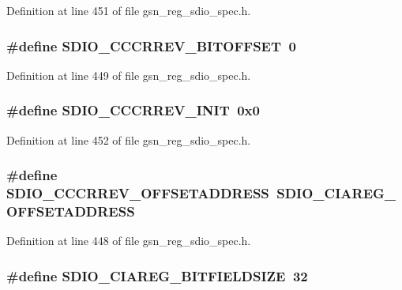 Definition at line 451 of file gsn\_\-reg\_\-sdio\_\-spec.h.

\hypertarget{a00571_a5e86721e7c9940d5ce5fa231cb751a61}{
\subsubsection[{SDIO\_\-CCCRREV\_\-BITOFFSET}]{\setlength{\rightskip}{0pt plus 5cm}\#define SDIO\_\-CCCRREV\_\-BITOFFSET~0}}
\label{a00571_a5e86721e7c9940d5ce5fa231cb751a61}


Definition at line 449 of file gsn\_\-reg\_\-sdio\_\-spec.h.

\hypertarget{a00571_ad170373a0f32920ed8df9cec00c9746d}{
\subsubsection[{SDIO\_\-CCCRREV\_\-INIT}]{\setlength{\rightskip}{0pt plus 5cm}\#define SDIO\_\-CCCRREV\_\-INIT~0x0}}
\label{a00571_ad170373a0f32920ed8df9cec00c9746d}


Definition at line 452 of file gsn\_\-reg\_\-sdio\_\-spec.h.

\hypertarget{a00571_a3bf2b1a6e4c4d0f671814dbafdc310d0}{
\subsubsection[{SDIO\_\-CCCRREV\_\-OFFSETADDRESS}]{\setlength{\rightskip}{0pt plus 5cm}\#define SDIO\_\-CCCRREV\_\-OFFSETADDRESS~SDIO\_\-CIAREG\_\-OFFSETADDRESS}}
\label{a00571_a3bf2b1a6e4c4d0f671814dbafdc310d0}


Definition at line 448 of file gsn\_\-reg\_\-sdio\_\-spec.h.

\hypertarget{a00571_a8bb86d03a43dedd115e9b60405c5b286}{
\subsubsection[{SDIO\_\-CIAREG\_\-BITFIELDSIZE}]{\setlength{\rightskip}{0pt plus 5cm}\#define SDIO\_\-CIAREG\_\-BITFIELDSIZE~32}}
\label{a00571_a8bb86d03a43dedd115e9b60405c5b286}


